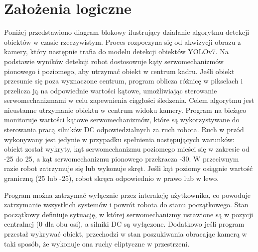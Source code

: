\documentclass[a4paper,twoside,12pt]{book}
\begin{document}
\section{Założenia logiczne}
Poniżej przedstawiono diagram blokowy ilustrujący działanie algorytmu detekcji obiektów w czasie rzeczywistym. Proces rozpoczyna się od akwizycji obrazu z kamery, który następnie trafia do modelu detekcji obiektów YOLOv7. Na podstawie wyników detekcji robot dostosowuje kąty serwomechanizmów pionowego i poziomego, aby utrzymać obiekt w centrum kadru. Jeśli obiekt przesunie się poza wyznaczone centrum, program oblicza różnicę w pikselach i przelicza ją na odpowiednie wartości kątowe, umożliwiając sterowanie serwomechanizmami w celu zapewnienia ciągłości śledzenia. Celem algorytmu jest nieustanne utrzymanie obiektu w centrum widoku kamery.
Program na bieżąco monitoruje wartości kątowe serwomechanizmów, które są wykorzystywane do sterowania pracą silników DC odpowiedzialnych za ruch robota. Ruch w przód wykonywany jest jedynie w przypadku spełnienia następujących warunków: obiekt został wykryty, kąt serwomechanizmu poziomego mieści się w zakresie od -25\textdegree{} do 25\textdegree{}, a kąt serwomechanizmu pionowego przekracza -30\textdegree{}. W przeciwnym razie robot zatrzymuje się lub wykonuje skręt. Jeśli kąt poziomy osiągnie wartość graniczną (25\textdegree{} lub -25\textdegree{}), robot skręca odpowiednio w prawo lub w lewo.

Program można zatrzymać wyłącznie przez interakcję użytkownika, co powoduje zatrzymanie wszystkich systemów i powrót robota do stanu początkowego. Stan początkowy definiuje sytuację, w której serwomechanizmy ustawione są w pozycji centralnej (0\textdegree{} dla obu osi), a silniki DC są wyłączone. Dodatkowo jeśli program przestał wykrywać obiekt, przechodzi w stan poszukiwania obracając kamerą w taki sposób, że wykonuje ona ruchy eliptyczne w przestrzeni.
\end{document}
